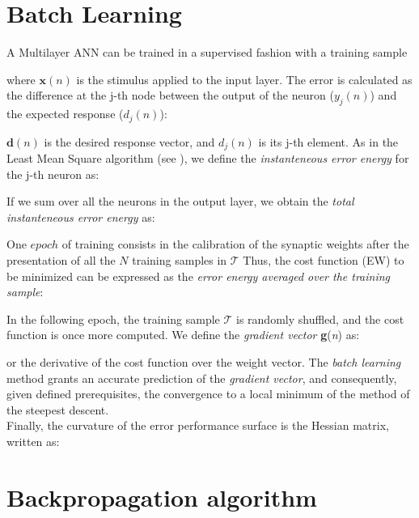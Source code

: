 
\section{Batch Learning}
\label{sec:batchlearning}

A Multilayer \acs{ANN} can be trained in a supervised fashion with a training
sample

where $\mathbf{x}(n)$ is the stimulus applied to the input layer.
The error is calculated 
as the difference at the j-th
node between the output of the neuron ($y_j(n)$) and the expected response
($d_j(n)$):

$\mathbf{d}(n)$ is the desired response vector, and $d_j(n)$ is its j-th
element.
As in the Least Mean Square algorithm (see \citet{RefWorks:158}), we define
the \textit{instanteneous error energy} for the j-th neuron as:

If we sum over all the neurons in the output layer, we obtain
the \textit{total instanteneous error energy} as:

One $epoch$ of training consists in the calibration of the synaptic weights
after the presentation of all the $N$ training samples in $\mathscr{T}$
Thus,
the cost function (\acs{EW}) to be minimized can be
expressed as the \textit{error energy averaged over the training sample}:

In the following epoch, the training sample $\mathscr{T}$ is randomly shuffled,
and the cost function is once more computed.
We define the \textit{gradient vector}
\textbf{g}(\textit{n}) as:

or the derivative of the cost function over the  weight vector.
The \textit{batch learning} method grants an accurate prediction of the
\textit{gradient vector}, and consequently, given defined prerequisites, the
convergence to a local minimum of the method of the steepest descent.\\
Finally, the curvature of the error performance surface is the Hessian matrix,
written as:


\section{Backpropagation algorithm}
\label{sec:backpropagationalgorithm}

